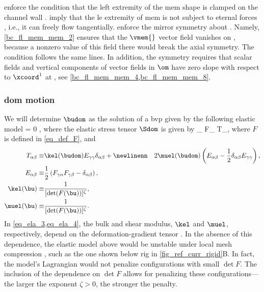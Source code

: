  enforce the condition that the left extremity of the \ac{mem} shape is clamped on the channel wall \pomin.
 imply that the \ac{le} extremity of \ac{mem} is not subject to  eternal forces \cite{landauFluidMechanics1987}, i.e., it can freely flow tangentially.
%
 enforce the mirror symmetry about \pomout.
Namely, \cref{bc_fl_mem_mem_2} ensures that the $\vmem{}$ vector field vanishes on \pomlineout, because a nonzero value of this field there  would break the axial symmetry. The condition  follows the same lines. In addition, the  symmetry requires that scalar fields and vertical components of vector fields in $\om$ have zero slope with respect to $\xcoord^1$ at \pomlineout{}, see \cref{bc_fl_mem_mem_4,bc_fl_mem_mem_8}.



\subsubsection{\Acl{dom} motion}
\label{sec_fl_mem_dom}



We will determine $\budom$ as the solution of a \ac{bvp} given by the following elastic model \cite{kamenskyLectureNotesMAE,marsdenMathematicalFoundationsElasticity1994}
\be\label{eq_mesh_fluid_rigid}
\pder{\Sdom_{\alpha \beta}(\budom)}{\xr[\beta]} = 0  \omr,
\ee
where the elastic stress tensor $\Sdom$ is given by
\be
\label{eq_def_S}
\Sdom_{\alpha \beta} \equiv F_{\alpha \gamma} T_{\gamma \beta},
\ee
where $F$ is defined in \cref{eq_def_F}, and
\begin{align}
        \label{eq_ela_1}
        T_{\alpha \beta}  \equiv & \kel(\budom) E_{\gamma \gamma} \delta_{\alpha \beta} +\newlinenn
                                 & 2 \muel(\budom) \left(E_{\alpha \beta} - \frac{1}{2} \delta_{\alpha \beta} E_{\gamma \gamma}\right), \\
        \label{eq_ela_2}
        E_{\alpha \beta}  \equiv & \frac{1}{2}\left( F_{\gamma \alpha}F_{\gamma \beta} - \delta_{\alpha \beta}\right),                  \\
        \label{eq_ela_3}
        \kel(\bu)         \equiv & \frac{1}{[\det(F(\bu))]^\zeta},                                                                      \\
        \label{eq_ela_4}
        \muel(\bu)        \equiv & \frac{1}{[\det(F(\bu))]^\zeta}.
\end{align}
In \cref{eq_ela_3,eq_ela_4}, the bulk and shear modulus, $\kel$ and $\muel$, respectively, depend on the deformation-gradient tensor . In the absence of this dependence, the elastic model above would be unstable under local mesh compression \cite{kamenskyLectureNotesMAE}, such as the one shown below \ac{rig} in \cref{fig_ref_curr_rigid}B. In fact, the model's Lagrangian would not penalize configurations with  small $\det F$. The inclusion of the dependence  on $\det F$  allows for penalizing these configurations---the larger the exponent $\zeta > 0$, the stronger the penalty.



